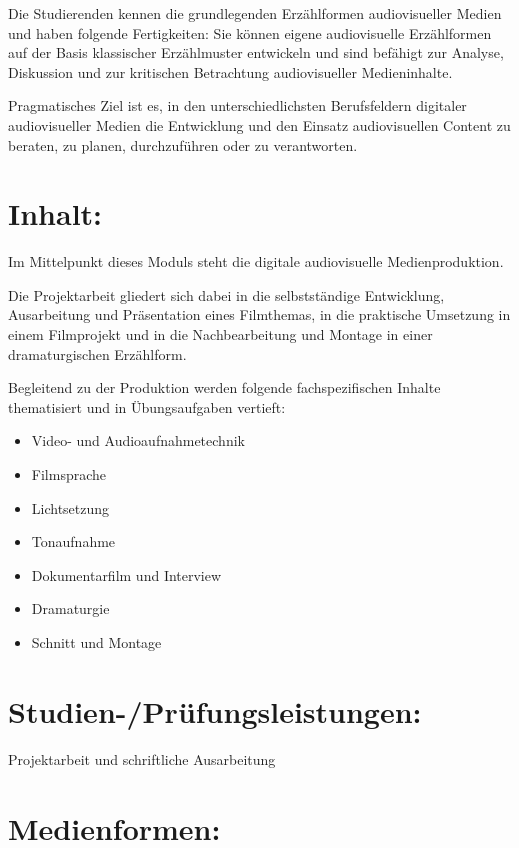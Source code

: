 Die Studierenden kennen die grundlegenden Erzählformen audiovisueller
Medien und haben folgende Fertigkeiten: Sie können eigene audiovisuelle
Erzählformen auf der Basis klassischer Erzählmuster entwickeln und sind
befähigt zur Analyse, Diskussion und zur kritischen Betrachtung
audiovisueller Medieninhalte.

Pragmatisches Ziel ist es, in den unterschiedlichsten Berufsfeldern
digitaler audiovisueller Medien die Entwicklung und den Einsatz
audiovisuellen Content zu beraten, zu planen, durchzuführen oder zu
verantworten.

\section*{Inhalt:}\label{inhalt-2}

Im Mittelpunkt dieses Moduls steht die digitale audiovisuelle
Medienproduktion.

Die Projektarbeit gliedert sich dabei in die selbstständige Entwicklung,
Ausarbeitung und Präsentation eines Filmthemas, in die praktische
Umsetzung in einem Filmprojekt und in die Nachbearbeitung und Montage in
einer dramaturgischen Erzählform.

Begleitend zu der Produktion werden folgende fachspezifischen Inhalte
thematisiert und in Übungsaufgaben vertieft:

\begin{itemize}
\item
  Video- und Audioaufnahmetechnik
\item
  Filmsprache
\item
  Lichtsetzung
\item
  Tonaufnahme
\item
  Dokumentarfilm und Interview
\item
  Dramaturgie
\item
  Schnitt und Montage
\end{itemize}

\section*{Studien-/Prüfungsleistungen:}\label{studien-pruxfcfungsleistungen-2}

Projektarbeit und schriftliche Ausarbeitung

\section*{Medienformen:}\label{medienformen-2}

